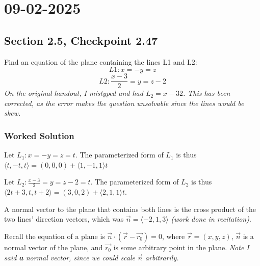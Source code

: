 \documentclass[]{mangos-musings}
\begin{document}
\newpage
\section*{09-02-2025}
\subsection*{Section 2.5, Checkpoint 2.47}
Find an equation of the plane containing the lines L1 and L2:
\[L1:x=-y=z\]
\[L2:\frac{x-3}{2}=y=z-2\]
\textit{On the original handout, I mistyped and had $L_2 = x - 32$. This has been corrected, as the error makes the question unsolvable since the lines would be skew.}
\subsubsection*{Worked Solution}


Let $L_1: x=-y=z = t$. The parameterized form of $L_1$ is thus $\langle t, -t, t\rangle = (0, 0, 0) + \langle 1, -1, 1\rangle t$

Let $L_2: \frac{x-3}{2}=y=z-2 = t$. The parameterized form of $L_2$ is thus $\langle2t + 3, t, t + 2 \rangle = (3, 0, 2) + \langle2, 1, 1\rangle t$.

A normal vector to the plane that contains both lines is the cross product of the two lines' direction vectors, which was $\vec{n} = \langle -2, 1, 3\rangle$ \textit{(work done in recitation)}.

Recall the equation of a plane is $\vec{n} \cdot (\vec{r} - \vec{r_0}) = 0$, where $\vec{r} = (x, y, z)$, $\vec{n}$
is a normal vector of the plane, and $\vec{r_0}$ is some arbitrary point in the plane.
\textit{Note I said \textbf{a} normal vector, since we could scale $\vec{n}$ arbitrarily.}
\end{document}
